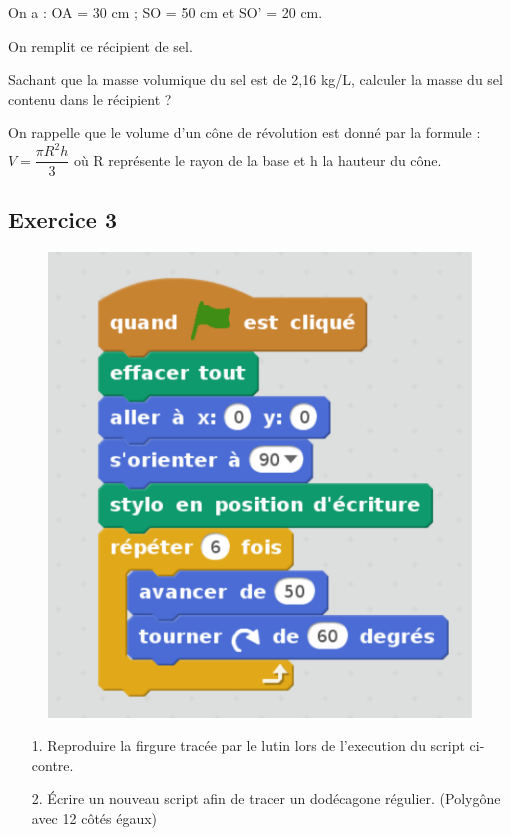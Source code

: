 \documentclass[12pt]{article}
\begin{document}
On a : OA = 30 cm ; SO = 50 cm et SO’ = 20 cm.

On remplit ce récipient de sel.

Sachant que la masse volumique du sel est de 2,16 kg/L, calculer la masse du sel contenu dans le récipient ?

On rappelle que le volume d’un cône de révolution est donné par la formule :
$V = \dfrac{\pi R^2 h}{3}$ où R représente le rayon de la base et h la hauteur du cône.

\newpage

\subsection*{Exercice 3}
\begin{multicols}{2}
  \begin{figure}[H]
    \centering
    \includegraphics[width=0.8\linewidth]{sources/scratch.pdf}
  \end{figure}

\begin{enumerate}
\item[1.] Reproduire la firgure tracée par le lutin lors de l'execution du script ci-contre.
\item[2.] Écrire un nouveau script afin de tracer un dodécagone régulier. (Polygône avec 12 côtés égaux) 
\end{enumerate}
\end{multicols}
\end{document}
